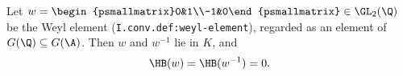 Let $w=\begin{psmallmatrix}0&1\\-1&0\end{psmallmatrix}\in\GL_2(\Q)$ be the Weyl element (\texttt{I.conv.def:weyl-element}), regarded as an element of
$G(\Q)\subseteq G(\A)$. Then $w$ and $w^{-1}$ lie in $K$, and
\[
  \HB(w)=\HB(w^{-1})=0 .
\]
